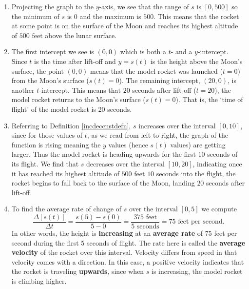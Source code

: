 \documentclass{ximera}
\begin{document}
\begin{example}
\begin{enumerate}
\begin{center}
\end{center}

\item  Projecting the graph to the $y$-axis, we see that the range of $s$ is $[0, 500]$ so the minimum of $s$ is $0$ and the maximum is $500$.  This means that the rocket at some point is on the surface of the Moon and reaches its highest altitude of $500$ feet above the lunar surface.

\item The first intercept we see is $(0, 0)$ which is both a $t$- and a $y$-intercept.  Since $t$ is the time after lift-off and $y = s(t)$ is  the height above the Moon's surface, the point $(0, 0)$ means that the model rocket was launched ($t=0$) from the Moon's surface ($s(t) = 0$).  The remaining intercept, $(20, 0)$,  is another $t$-intercept.  This means that $20$ seconds after lift-off ($t=20$), the model rocket returns to the Moon's surface ($s(t) = 0$).   That is, the `time of flight' of the model rocket is 20 seconds.

\item  Referring to Definition \ref{incdeccnstdefn}, $s$ increases over the interval $[0, 10]$, since for those values of $t$, as we read from left to right, the graph of the function is rising meaning the $y$ values (hence $s(t)$ values) are getting larger. Thus the model rocket is heading upwards for the first $10$ seconds of its flight.  We find that $s$ decreases over the interval $[10, 20]$, indicating once it has reached its highest altitude of $500$ feet $10$ seconds into the flight, the rocket begins to fall back to the surface of the Moon, landing $20$ seconds after lift-off.

\item  To find the average rate of change of $s$ over the interval $[0, 5]$ we compute \[ \dfrac{\Delta[s(t)]}{\Delta t} = \dfrac{s(5) - s(0)}{5 - 0} = \dfrac{\text{$375$ feet}}{\text{$5$ seconds}} = \text{$75$ feet per second}.\] In other words, the height is \textbf{increasing} at an \textbf{average rate} of $75$ feet per second during the first 5 seconds of flight.  The rate here is called the  \textbf{average velocity} of the rocket over this interval.  Velocity differs from speed in that velocity comes with a direction.  In this case, a positive velocity indicates that the rocket is traveling \textbf{upwards}, since when $s$ is increasing, the model rocket is climbing higher.  




\end{enumerate}
\end{example}
\end{document}
